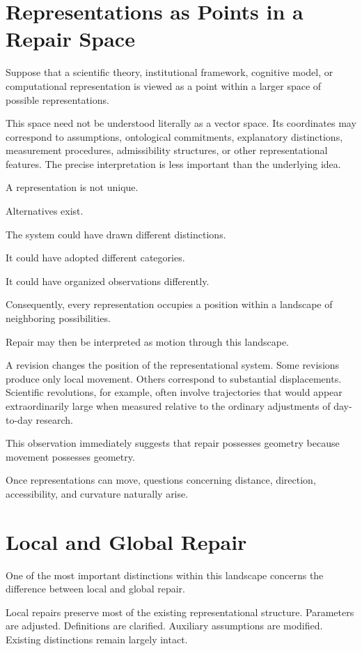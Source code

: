 \documentclass[11pt,oneside,openany]{book}
\begin{document}
\section{Representations as Points in a Repair Space}

Suppose that a scientific theory, institutional framework, cognitive model, or computational representation is viewed as a point within a larger space of possible representations.

This space need not be understood literally as a vector space. Its coordinates may correspond to assumptions, ontological commitments, explanatory distinctions, measurement procedures, admissibility structures, or other representational features. The precise interpretation is less important than the underlying idea.

A representation is not unique.

Alternatives exist.

The system could have drawn different distinctions.

It could have adopted different categories.

It could have organized observations differently.

Consequently, every representation occupies a position within a landscape of neighboring possibilities.

Repair may then be interpreted as motion through this landscape.

A revision changes the position of the representational system. Some revisions produce only local movement. Others correspond to substantial displacements. Scientific revolutions, for example, often involve trajectories that would appear extraordinarily large when measured relative to the ordinary adjustments of day-to-day research.

This observation immediately suggests that repair possesses geometry because movement possesses geometry.

Once representations can move, questions concerning distance, direction, accessibility, and curvature naturally arise.

\section{Local and Global Repair}

One of the most important distinctions within this landscape concerns the difference between local and global repair.

Local repairs preserve most of the existing representational structure. Parameters are adjusted. Definitions are clarified. Auxiliary assumptions are modified. Existing distinctions remain largely intact.
\end{document}
